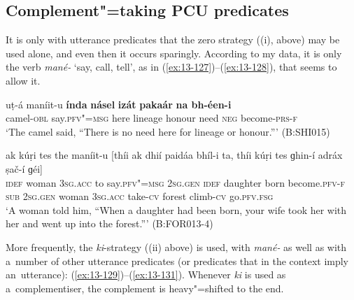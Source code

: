 \subsection{Complement"=taking PCU predicates}
\label{subsec:13-5-1}

 It is only with utterance predicates that the zero strategy ((i), above) may be used alone, and even then it occurs sparingly. According to my data, it is only the verb \textit{mané-} `say, call, tell', as in (\ref{ex:13-127})--(\ref{ex:13-128}), that seems to allow it.

\begin{exe}
\ex
\label{ex:13-127}
\gll uṭ-á maníit-u \textbf{índa} \textbf{násel} \textbf{izát} \textbf{pakaár} \textbf{ na bh-éen-i}  \\
camel-\textsc{obl}  say.\textsc{pfv"=msg} here lineage honour need  \textsc{neg} become-\textsc{prs-f} \\
\glt `The camel said, ``There is no need here for lineage or honour.''' (B:SHI015)

\ex
\label{ex:13-128}
\gll ak kúṛi tes the maníit-u [thíi ak  dhií paidáa bhíl-i ta, thíi
  kúṛi tes  ɡhin-í adráx ṣač-í ɡéi] \\
\textsc{idef} woman \textsc{3sg.acc} to say.\textsc{pfv"=msg} \textsc{2sg.gen} \textsc{idef}  daughter born become.\textsc{pfv-f} \textsc{sub} \textsc{2sg.gen} woman \textsc{3sg.acc}  take-\textsc{cv} forest climb-\textsc{cv} go.\textsc{pfv.fsg}  \\
\glt `A woman told him, ``When a daughter had been born, your wife took her with her and went up into the forest.''' (B:FOR013-4) 
\end{exe}

More frequently, the \textit{ki}-strategy ((ii) above) is used, with \textit{mané-} as well as with a~number of other utterance predicates (or predicates that in the context imply an~utterance): (\ref{ex:13-129})--(\ref{ex:13-131}). Whenever \textit{ki} is used as a~complementiser, the complement is heavy"=shifted to the end.

